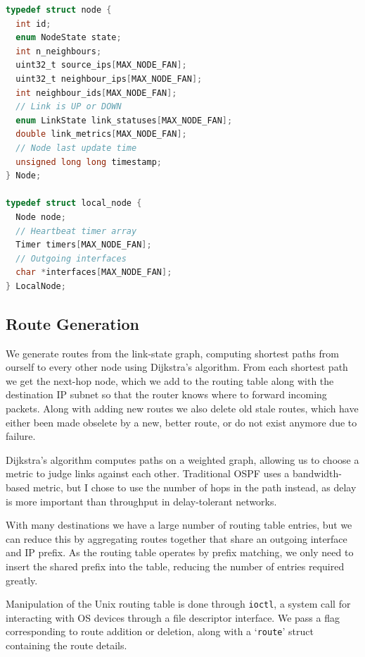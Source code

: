 \documentclass[withindex,glossary,openany]{cam-thesis}
\begin{document}
\begin{minipage}{1\textwidth} \centering
\begin{lstlisting}[language=C, label=node_data_structs, frame=tb, columns=fullflexible, caption=C source code for \texttt{Node} and \texttt{LocalNode} data structures.]
typedef struct node {
  int id;
  enum NodeState state;
  int n_neighbours;
  uint32_t source_ips[MAX_NODE_FAN];
  uint32_t neighbour_ips[MAX_NODE_FAN];
  int neighbour_ids[MAX_NODE_FAN];
  // Link is UP or DOWN
  enum LinkState link_statuses[MAX_NODE_FAN];
  double link_metrics[MAX_NODE_FAN];
  // Node last update time
  unsigned long long timestamp;
} Node;

typedef struct local_node {
  Node node;
  // Heartbeat timer array
  Timer timers[MAX_NODE_FAN];
  // Outgoing interfaces
  char *interfaces[MAX_NODE_FAN];
} LocalNode;
\end{lstlisting}
\end{minipage}

\subsection{Route Generation}

We generate routes from the link-state graph, computing shortest paths from ourself to every other node using Dijkstra's algorithm. From each shortest path we get the next-hop node, which we add to the routing table along with the destination IP subnet so that the router knows where to forward incoming packets. Along with adding new routes we also delete old stale routes, which have either been made obselete by a new, better route, or do not exist anymore due to failure.

Dijkstra's algorithm computes paths on a weighted graph, allowing us to choose a metric to judge links against each other. Traditional OSPF uses a bandwidth-based metric, but I chose to use the number of hops in the path instead, as delay is more important than throughput in delay-tolerant networks.

With many destinations we have a large number of routing table entries, but we can reduce this by aggregating routes together that share an outgoing interface and IP prefix. As the routing table operates by prefix matching, we only need to insert the shared prefix into the table, reducing the number of entries required greatly.

Manipulation of the Unix routing table is done through \texttt{ioctl}, a system call for interacting with OS devices through a file descriptor interface. We pass a flag corresponding to route addition or deletion, along with a `\texttt{route}' struct containing the route details.
\end{document}

